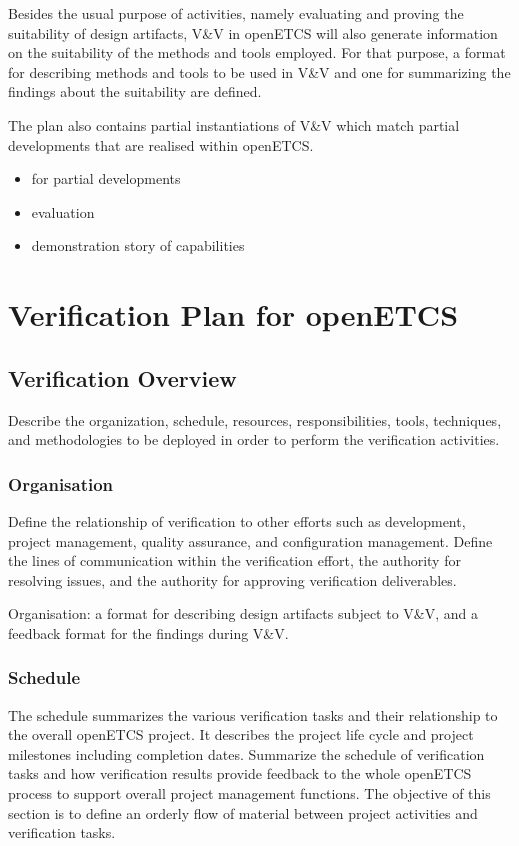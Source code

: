 \documentclass{template/openetcs_report}
\begin{document}
Besides the usual purpose of \vv activities, namely evaluating and
  proving the suitability of design artifacts, V\&V in openETCS will
  also generate information on the suitability of the methods and tools
  employed. For that purpose, a format for describing methods
  and tools to be used in V\&V and one for summarizing the findings
  about the suitability are defined.

  The plan also contains partial instantiations of V\&V which match
  partial developments that are realised within openETCS.

{\it
  \begin{itemize}
  \item \vv for partial developments
  \item evaluation
  \item demonstration story of capabilities
  \end{itemize}
}


\section{Verification Plan for openETCS}
\label{sec:verif-plan-open}



\subsection{Verification Overview}
\label{sec:verif-overv}
 Describe the organization, schedule, resources, responsibilities, tools, techniques, and methodologies to be 
deployed in order to perform the verification activities.


\subsubsection{Organisation}
Define the relationship of verification to other efforts such as development, project management, quality assurance, and configuration management. Define the lines of communication within the verification effort, the authority for resolving issues, and the authority for approving verification deliverables.

Organisation: a format for describing design artifacts subject to V\&V,
  and a feedback format for the findings during V\&V.

\subsubsection{Schedule}
The schedule summarizes the various verification tasks
and their relationship to the overall openETCS project.
It describes the project life cycle and project milestones including completion dates.
Summarize the schedule of verification tasks and how verification results provide feedback to the whole openETCS process to support overall project management functions.
The objective of this section is to define an orderly flow of material between project activities and verification tasks.
\end{document}
